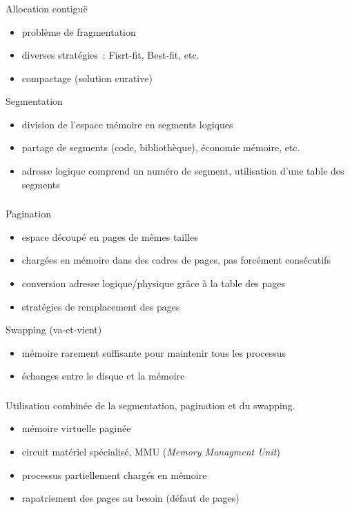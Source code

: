 \begin{frame}
  \frametitle{\insertsubsection}
  \alert{Allocation contiguë}
  \begin{itemize}
  \item problème de fragmentation 
  \item diverses stratégies~: Fisrt-fit, Best-fit, etc.
  \item compactage (solution curative)
  \end{itemize}
  \alert{Segmentation} 
  \begin{itemize}
  \item division de l’espace mémoire en segments logiques
  \item partage de segments (code, bibliothèque), économie mémoire, etc.
  \item adresse logique comprend un numéro de segment, utilisation d'une table des segments
  \end{itemize}
\end{frame}

\begin{frame}
\frametitle{\insertsubsection}
\alert{Pagination}
  \begin{itemize}
  \item espace découpé en pages de mêmes tailles
  \item chargées en mémoire dans des cadres de pages, pas forcément consécutifs
  \item conversion adresse logique/physique grâce à la table des pages
  \item stratégies de remplacement des pages 
  \end{itemize}
\alert{Swapping (va-et-vient)}
  \begin{itemize}
  \item mémoire rarement suffisante pour maintenir tous les processus 
  \item échanges entre le disque et la mémoire
  \end{itemize}
\end{frame}


\begin{frame}
  \frametitle{\insertsubsection}
  Utilisation combinée de la segmentation, pagination et du swapping.
  \begin{itemize}
  \item[\ding{212}] mémoire virtuelle paginée 
  \item circuit matériel spécialisé, MMU (\emph{Memory Managment Unit})
  \item processus partiellement chargés en mémoire
  \item rapatriement des pages au besoin (défaut de pages) 
  \end{itemize}
\end{frame}



